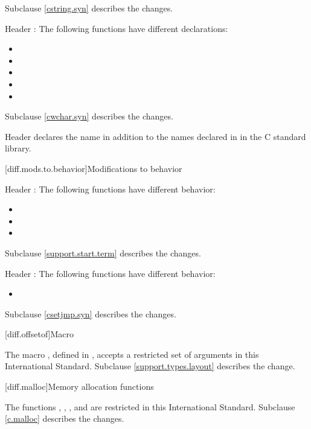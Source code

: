 Subclause \ref{cstring.syn} describes the changes.

\pnum
Header :
The following functions have different declarations:

\begin{itemize}
\item {}
\item {}
\item {}
\item {}
\item {}
\end{itemize}

Subclause \ref{cwchar.syn} describes the changes.

\pnum
Header 
declares the name  in addition to the names declared in
 in the C standard library.

[diff.mods.to.behavior]{Modifications to behavior}

\pnum
Header :
The following functions have different behavior:

\begin{itemize}
\item {}
\item {}
\item {}
\end{itemize}

Subclause \ref{support.start.term} describes the changes.

\pnum
Header :
The following functions have different behavior:

\begin{itemize}
\item {}
\end{itemize}

Subclause \ref{csetjmp.syn} describes the changes.

[diff.offsetof]{Macro }
%

\pnum
The macro , defined in
,
accepts a restricted set of  arguments in this International Standard.
Subclause \ref{support.types.layout} describes the change.

[diff.malloc]{Memory allocation functions}

\pnum
The functions
,
,
,
and
are restricted in this International Standard.
Subclause \ref{c.malloc} describes the changes.

